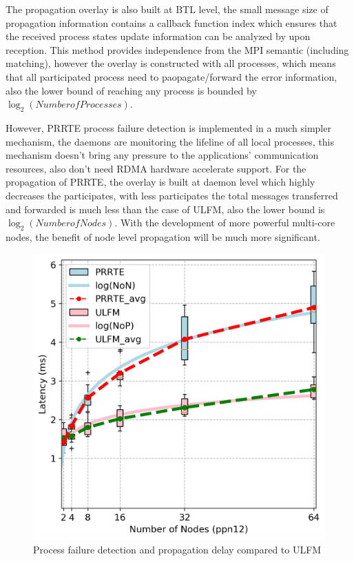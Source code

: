 \documentclass[sigconf]{acmart}
\begin{document}
The propagation overlay is also built at BTL level, the small message size of propagation information contains a callback function index which ensures that the received process states update information can be analyzed by upon reception. This method provides independence from the MPI semantic (including matching), however the overlay is constructed with all processes, which means that all participated process need to paopagate/forward the error information, also the lower bound of reaching any process is bounded by $\log_2(Number of Processes)$.  

However, PRRTE process failure detection is implemented in a much simpler mechanism, the daemons are monitoring the lifeline of all local processes, this mechanism doesn't bring any pressure to the applications' communication resources, also don't need RDMA hardware accelerate support. For the propagation of PRRTE, the overlay is built at daemon level which highly decreases the participates, with less participates the total messages transferred and forwarded is much less than the case of ULFM, also the lower bound is $\log_2({Number of Nodes})$. With the development of more powerful multi-core nodes, the benefit of node level propagation will be much more significant.

\begin{figure}[h]
  \centering
  \includegraphics[width=\linewidth]{Process_Failure_log_fit.png}
  \caption{Process failure detection and propagation delay compared to ULFM}
\end{figure}
\end{document}
